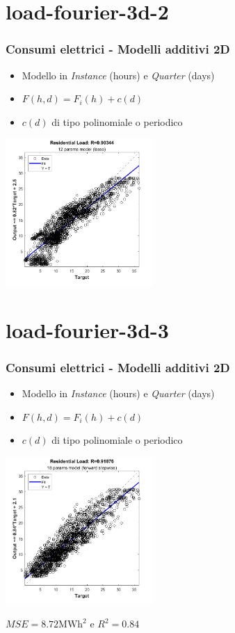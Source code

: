 \documentclass{beamer}
\begin{document}
\section{load-fourier-3d-2}
\begin{frame}
    \frametitle{Consumi elettrici - Modelli additivi 2D}   
    \begin{itemize}
        \item Modello in \textit{Instance} (hours) e \textit{Quarter} (days)
        \item $F(h, d)=F_i(h)+c(d)$
        \item $c(d)$ di tipo polinomiale o periodico
    \end{itemize}
    \vspace{0.3cm}
    \vfill
    \centering
    \includegraphics[width=0.42\textwidth,keepaspectratio]{all_residential_load_lasso_const_f_plotregression.png} 
\end{frame}

\section{load-fourier-3d-3}
\begin{frame}
    \frametitle{Consumi elettrici - Modelli additivi 2D}   
    \begin{itemize}
        \item Modello in \textit{Instance} (hours) e \textit{Quarter} (days)
        \item $F(h, d)=F_i(h)+c(d)$
        \item $c(d)$ di tipo polinomiale o periodico
    \end{itemize}
    \vspace{0.3cm}
    \vfill
    \centering
    \includegraphics[width=0.42\textwidth,keepaspectratio]{all_residential_load_forw_plotregression.png} 

    \scriptsize $MSE= 8.72\text{MWh}^2$ e $R^2=0.84$
\end{frame}
\end{document}
